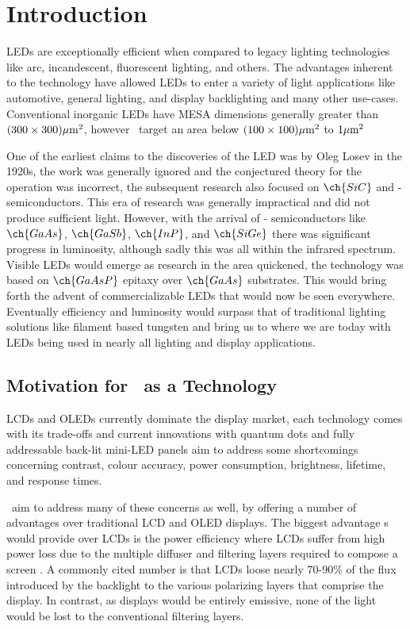 \chapter{Introduction}

LEDs are exceptionally efficient when compared to legacy lighting technologies like arc, incandescent, fluorescent lighting, and others. The advantages inherent to the technology have allowed LEDs to enter a variety of light applications like automotive, general lighting, and display backlighting and many other use-cases. \cite{uLED_review}
Conventional inorganic LEDs have MESA dimensions generally greater than $(300\times 300) \umm$, however \uleds \ target an area below $(100\times 100) \umm$ to $1 \umm$ \cite{parbrook2021micro}

One of the earliest claims to the discoveries of the LED was by Oleg Losev in the 1920s, the work was generally ignored and the conjectured theory for the operation was incorrect, the subsequent research also focused on $\ch{SiC}$ and - semiconductors. This era of research was generally impractical and did not produce sufficient light. However, with the arrival of - semiconductors like $\ch{GaAs}$, $\ch{GaSb}$, $\ch{InP}$, and $\ch{SiGe}$ there was significant progress in luminosity, although sadly this was all within the infrared spectrum.
Visible LEDs would emerge as research in the area quickened, the technology was based on $\ch{GaAsP}$ epitaxy over $\ch{GaAs}$ substrates. This would bring forth the advent of commercializable LEDs that would now be seen everywhere. Eventually efficiency and luminosity would surpass that of traditional lighting solutions like filament based tungsten and bring us to where we are today with LEDs being used in nearly all lighting and display applications.




\section{Motivation for \uleds \ as a Technology}
LCDs and OLEDs currently dominate the display market, each technology comes with its trade-offs and current innovations with quantum dots and fully addressable back-lit mini-LED panels aim to address some shortcomings concerning contrast, colour accuracy, power consumption, brightness, lifetime, and response times.

\uleds \ aim to address many of these concerns as well, by offering a number of advantages over traditional LCD and OLED displays. The biggest advantage \uled s would provide over LCDs is the power efficiency where LCDs suffer from high power loss due to the multiple diffuser and filtering layers required to compose a screen \cite{LCD_bad}. A commonly cited number is that LCDs loose nearly 70-90\% of the flux introduced by the backlight to the various polarizing layers that comprise the display. In contrast, as \uled  displays would be entirely emissive, none of the light would be lost to the conventional filtering layers.


